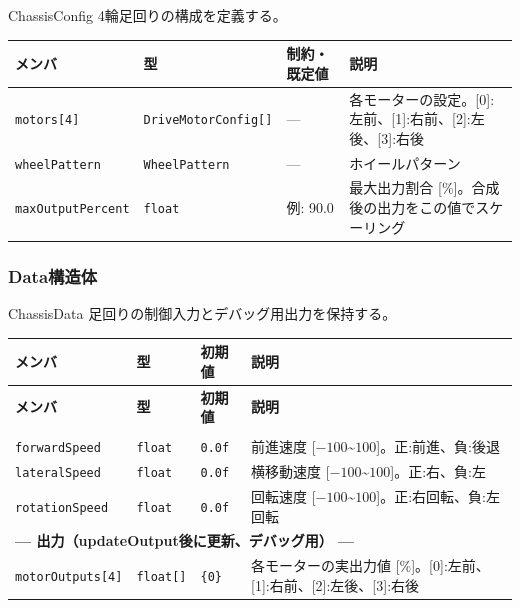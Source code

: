 \begin{funcblock}{ChassisConfig}
4輪足回りの構成を定義する。

\begin{longtable}{l l l p{4.0cm}}
\toprule
\textbf{メンバ} & \textbf{型} & \textbf{制約・既定値} & \textbf{説明} \\
\midrule
\endhead
\texttt{motors[4]}        & \texttt{DriveMotorConfig[]} & ---         & 各モーターの設定。[0]:左前、[1]:右前、[2]:左後、[3]:右後 \\
\texttt{wheelPattern}     & \texttt{WheelPattern}       & ---         & ホイールパターン \\
\texttt{maxOutputPercent}  & \texttt{float}             & 例: 90.0    & 最大出力割合 [\%]。合成後の出力をこの値でスケーリング \\
\bottomrule
\end{longtable}
\end{funcblock}

\subsubsection{Data構造体}

\begin{funcblock}{ChassisData}
足回りの制御入力とデバッグ用出力を保持する。

\begin{longtable}{l l l p{4.0cm}}
\toprule
\textbf{メンバ} & \textbf{型} & \textbf{初期値} & \textbf{説明} \\
\midrule
\endfirsthead
\toprule
\textbf{メンバ} & \textbf{型} & \textbf{初期値} & \textbf{説明} \\
\midrule
\endhead
\bottomrule
\endlastfoot
\multicolumn{4}{l}{\textbf{--- 入力（ロジックフェーズで設定） ---}} \\
\texttt{forwardSpeed}  & \texttt{float} & \texttt{0.0f} & 前進速度 [$-100$\textasciitilde$100$]。正:前進、負:後退 \\
\texttt{lateralSpeed}  & \texttt{float} & \texttt{0.0f} & 横移動速度 [$-100$\textasciitilde$100$]。正:右、負:左 \\
\texttt{rotationSpeed} & \texttt{float} & \texttt{0.0f} & 回転速度 [$-100$\textasciitilde$100$]。正:右回転、負:左回転 \\
\midrule
\multicolumn{4}{l}{\textbf{--- 出力（updateOutput後に更新、デバッグ用） ---}} \\
\texttt{motorOutputs[4]} & \texttt{float[]} & \texttt{\{0\}} & 各モーターの実出力値 [\%]。[0]:左前、[1]:右前、[2]:左後、[3]:右後 \\
\end{longtable}
\end{funcblock}

